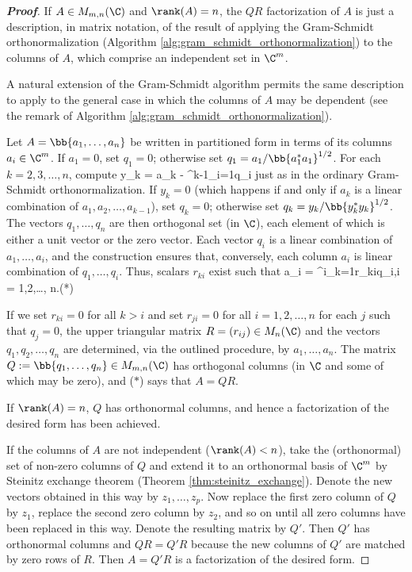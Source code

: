 \begin{proof}[\bf Proof]%
If $A\in M_{m,n}(\C)$ and $\rank (A) = n$, the $QR$ factorization of $A$ is just a description, in matrix notation, of the result of applying the Gram-Schmidt orthonormalization (Algorithm
\ref{alg:gram_schmidt_orthonormalization}) to the columns of $A$, which comprise an independent set in $\C^m$.

A natural extension of the Gram-Schmidt algorithm permits the same description to apply to the general case in which the columns of $A$ may be dependent (see the remark of Algorithm
\ref{alg:gram_schmidt_orthonormalization}).

Let $A = \bb{a_1,\dots,a_n}$ be written in partitioned form in terms of its columns $a_i\in \C^m$. If $a_1 = 0$, set $q_1 = 0$; otherwise set $q_1 = a_1 /\bb{a_1^*a_1}^{1/2}$. For each
$k=2,3,\dots,n$, compute
\be
y_k = a_k - \sum^{k-1}_{i=1}q_i
\ee
just as in the ordinary Gram-Schmidt orthonormalization. If $y_k = 0$ (which happens if and only if $a_k$ is a linear combination of $a_1,a_2,\dots,a_{k-1}$), set $q_k = 0$; otherwise set $q_k = y_k
/ \bb{y_k^*y_k}^{1/2}$. The vectors $q_1,\dots,q_n$ are then orthogonal set (in $\C$), each element of which is either a unit vector or the zero vector. Each vector $q_i$ is a linear combination of
$a_1,\dots,a_i$, and the construction ensures that, conversely, each column $a_i$ is linear combination of $q_1,\dots,q_i$. Thus, scalars $r_{ki}$ exist such that
\be
a_i = \sum^i_{k=1}r_{ki}q_i,\qquad i = 1,2,\dots, n.\qquad (*)
\ee

If we set $r_{ki}=0$ for all $k>i$ and set $r_{ji} = 0$ for all $i = 1,2,\dots,n$ for each $j$ such that $q_j = 0$, the upper triangular matrix $R = (r_{ij})\in M_n(\C)$ and the vectors
$q_1,q_2,\dots,q_n$ are determined, via the outlined procedure, by $a_1,\dots,a_n$. The matrix $Q := \bb{q_1,\dots,q_n}\in M_{m,n}(\C)$ has orthogonal columns (in $\C$ and some of which may be
zero), and ($*$) says that $A = QR$.

If $\rank(A) = n$, $Q$ has orthonormal columns, and hence a factorization of the desired form has been achieved.

If the columns of $A$ are not independent ($\rank(A) < n$), take the (orthonormal) set of non-zero columns of $Q$ and extend it to an orthonormal basis of $\C^m$ by Steinitz exchange theorem
(Theorem \ref{thm:steinitz_exchange}). Denote the new vectors obtained in this way by $z_1,\dots,z_p$. Now replace the first zero column of $Q$ by $z_1$, replace the second zero column by $z_2$, and
so on until all zero columns have been replaced in this way. Denote the resulting matrix by $Q'$. Then $Q'$ has orthonormal columns and $QR = Q'R$ because the new columns of $Q'$ are matched by
zero rows of $R$. Then $A = Q'R$ is a factorization of the desired form.


\end{proof}
